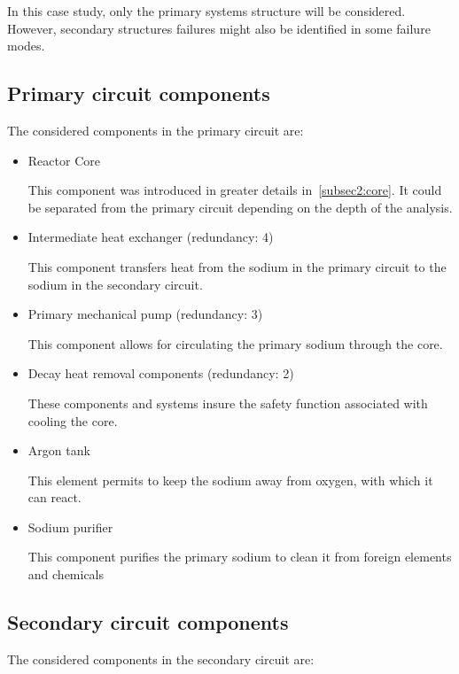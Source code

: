 In this case study, only the primary systems structure will be considered. However, secondary structures failures might also be identified in some failure modes.

\subsection{Primary circuit components}
\label{subsec2:primary}

The considered components in the primary circuit are:

\begin{itemize}
\item Reactor Core

    This component was introduced in greater details in~\ref{subsec2:core}. It could be separated from the primary circuit depending on the depth of the analysis.
    
\item Intermediate heat exchanger (redundancy: 4)

    This component transfers heat from the sodium in the primary circuit to the sodium in the secondary circuit.

\item Primary mechanical pump (redundancy: 3)

    This component allows for circulating the primary sodium through the core.

\item Decay heat removal components (redundancy: 2)

    These components and systems insure the safety function associated with cooling the core.

\item Argon tank

    This element permits to keep the sodium away from oxygen, with which it can react.

\item Sodium purifier

    This component purifies the primary sodium to clean it from foreign elements and chemicals
\end{itemize}


\subsection{Secondary circuit components}
\label{subsec2:secondary}

The considered components in the secondary circuit are:

